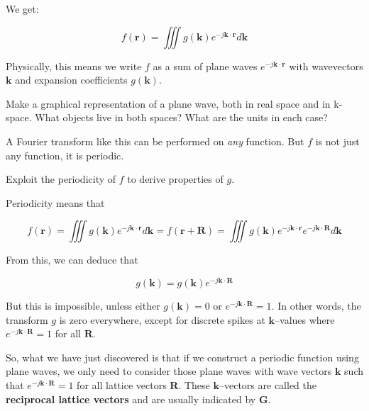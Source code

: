 We get:

\begin{equation}
f({\mathbf r}) = \iiint g({\mathbf k}) e ^ {-j {\mathbf k} \cdot {\mathbf r}} d{\mathbf k}
\end{equation} 

Physically, this means we write $f$ as a sum of plane waves $e ^ {-j {\mathbf k} \cdot {\mathbf r}}$ with wavevectors ${\mathbf k}$ and expansion coefficients $g({\mathbf k})$.


\begin{exer}
Make a graphical representation of a plane wave, both in real space and in k-space. What objects live in both spaces? What are the units in each case?
\end{exer}

A Fourier transform like this can be performed on \emph{any} function. But $f$ is not just any function, it is periodic.

\begin{cue}
Exploit the periodicity of $f$ to derive properties of $g$. 
\end{cue}

Periodicity means that

\begin{equation}
f({\mathbf r}) = \iiint g({\mathbf k}) e ^ {-j {\mathbf k} \cdot {\mathbf r}} d{\mathbf k} = f({\mathbf r} + {\mathbf R}) = \iiint g({\mathbf k}) e ^ {-j {\mathbf k} \cdot {\mathbf r}} e ^ {-j {\mathbf k} \cdot {\mathbf R}} d{\mathbf k}
\end{equation} 

From this, we can deduce that

\begin{equation}
g({\mathbf k}) = g({\mathbf k}) e ^ {-j {\mathbf k} \cdot {\mathbf R}}
\end{equation} 

But this is impossible, unless either $g({\mathbf k}) = 0$ or $e ^ {-j {\mathbf k} \cdot {\mathbf R}} = 1$. In other words, the transform $g$ is zero everywhere, except for discrete spikes at ${\mathbf k}$--values where $e ^ {-j {\mathbf k} \cdot {\mathbf R}} = 1$ for all ${\mathbf R}$.

So, what we have just discovered is that if we construct a periodic function using plane waves, we only need to consider those plane waves with wave vectors ${\mathbf k}$ such that $e ^ {-j {\mathbf k} \cdot {\mathbf R}} = 1$ for all lattice vectors ${\mathbf R}$. These ${\mathbf k}$--vectors are called the \textbf{reciprocal lattice vectors} and are usually indicated by ${\mathbf G}$.

